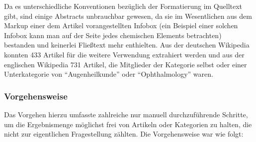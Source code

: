 \documentclass[pagesize,paper=A4,DIV=calc,fontsize=12pt,draft=false]{scrreprt}
\begin{document}
Da es unterschiedliche Konventionen bezüglich der Formatierung im Quelltext gibt, sind einige Abstracts unbrauchbar gewesen, da sie im Wesentlichen aus dem Markup einer dem Artikel vorangestellten Infobox (ein Beispiel einer solchen Infobox kann man auf der Seite jedes chemischen Elements betrachten) bestanden und keinerlei Fließtext mehr enthielten. 
Aus der deutschen Wikipedia konnten 433 Artikel für die weitere Verwendung extrahiert werden und aus der englischen Wikipedia 731 Artikel, die Mitglieder der Kategorie selbst oder einer Unterkategorie von \enquote{Augenheilkunde} oder \enquote{Ophthalmology} waren. 

\subsubsection{Vorgehensweise}

Das Vorgehen hierzu umfasste zahlreiche nur manuell durchzuführende Schritte, um die Ergebnismenge möglichst frei von Artikeln oder Kategorien zu halten, die nicht zur eigentlichen Fragestellung zählten. 
Die Vorgehensweise war wie folgt: 
\end{document}
